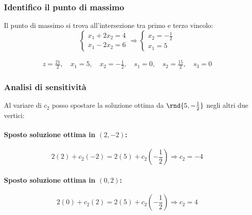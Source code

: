 \documentclass[\main/main.tex]{subfiles}
\begin{document}
\subsubsection*{Identifico il punto di massimo}
Il punto di massimo si trova all'intersezione tra primo e terzo vincolo:
\[
  \begin{cases}
    x_1 + 2x_2 = 4 \\
    x_1 - 2x_2 = 6
  \end{cases}
  \Rightarrow
  \begin{cases}
    x_2 = -\frac{1}{2} \\
    x_1 = 5
  \end{cases}
\]

\begin{align*}
  z   = \frac{21}{2}  ,\quad
  x_1 = 5             ,\quad
  x_2 = -\frac{1}{2}  ,\quad
  s_1 = 0             ,\quad
  s_2 = \frac{15}{2} ,\quad
  s_3 = 0
\end{align*}

\subsubsection*{Analisi di sensitività}
Al variare di $c_2$ posso spostare la soluzione ottima da $\rnd{5, -\frac{1}{2}}$ negli altri due vertici:

\paragraph*{Sposto soluzione ottima in $(2,-2)$:}

\[
  2(2) + c_2(-2) = 2(5) + c_2(-\frac{1}{2}) \Rightarrow c_2 = -4
\]
\paragraph*{Sposto soluzione ottima in $(0,2)$:}

\[
  2(0) + c_2(2) = 2(5) + c_2(-\frac{1}{2}) \Rightarrow c_2 = 4
\]
\end{document}
